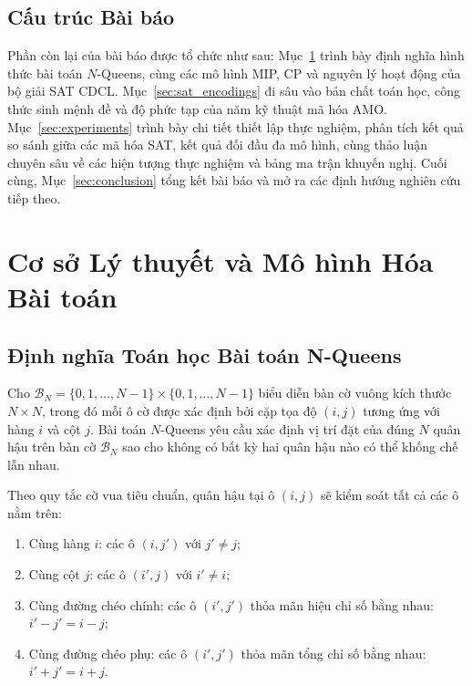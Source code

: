 \documentclass[a4paper,fleqn]{cas-sc}
\begin{document}
\subsection{Cấu trúc Bài báo}
Phần còn lại của bài báo được tổ chức như sau: Mục~\ref{sec:background} trình bày định nghĩa hình thức bài toán $N$-Queens, cùng các mô hình MIP, CP và nguyên lý hoạt động của bộ giải SAT CDCL. Mục~\ref{sec:sat_encodings} đi sâu vào bản chất toán học, công thức sinh mệnh đề và độ phức tạp của năm kỹ thuật mã hóa AMO. Mục~\ref{sec:experiments} trình bày chi tiết thiết lập thực nghiệm, phân tích kết quả so sánh giữa các mã hóa SAT, kết quả đối đầu đa mô hình, cùng thảo luận chuyên sâu về các hiện tượng thực nghiệm và bảng ma trận khuyến nghị. Cuối cùng, Mục~\ref{sec:conclusion} tổng kết bài báo và mở ra các định hướng nghiên cứu tiếp theo.

\section{Cơ sở Lý thuyết và Mô hình Hóa Bài toán}
\label{sec:background}

\subsection{Định nghĩa Toán học Bài toán N-Queens}
Cho $\mathcal{B}_N = \{0, 1, \dots, N-1\} \times \{0, 1, \dots, N-1\}$ biểu diễn bàn cờ vuông kích thước $N \times N$, trong đó mỗi ô cờ được xác định bởi cặp tọa độ $(i, j)$ tương ứng với hàng $i$ và cột $j$. Bài toán $N$-Queens yêu cầu xác định vị trí đặt của đúng $N$ quân hậu trên bàn cờ $\mathcal{B}_N$ sao cho không có bất kỳ hai quân hậu nào có thể khống chế lẫn nhau.

Theo quy tắc cờ vua tiêu chuẩn, quân hậu tại ô $(i, j)$ sẽ kiểm soát tất cả các ô nằm trên:
\begin{enumerate}
    \item Cùng hàng $i$: các ô $(i, j')$ với $j' \neq j$;
    \item Cùng cột $j$: các ô $(i', j)$ với $i' \neq i$;
    \item Cùng đường chéo chính: các ô $(i', j')$ thỏa mãn hiệu chỉ số bằng nhau: $i' - j' = i - j$;
    \item Cùng đường chéo phụ: các ô $(i', j')$ thỏa mãn tổng chỉ số bằng nhau: $i' + j' = i + j$.
\end{enumerate}
\end{document}
